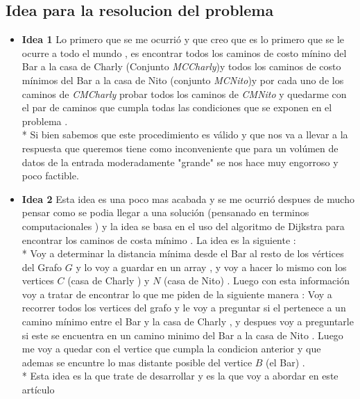 \documentclass[10pt]{article}
\begin{document}
    \subsection*{ Idea para la resolucion del problema } 
    \begin{itemize}
        \item \textbf{Idea 1 }Lo primero que se me ocurri\'o y que creo que es lo primero que se le ocurre a todo el mundo , es encontrar todos los caminos de costo m\'inino del Bar a la casa de Charly (Conjunto \textit{MCCharly})y todos los caminos de costo m\'inimos del Bar a la casa de Nito (conjunto \textit{MCNito})y por cada uno de los caminos de \textit{CMCharly} probar todos 
        los caminos de \textit{CMNito} y quedarme con el par de caminos que cumpla todas las condiciones que se exponen en el problema .
        \\*
        Si bien sabemos que este procedimiento es v\'alido y que nos va a 
        llevar a la respuesta que queremos tiene como inconveniente que 
        para un vol\'umen de datos de la entrada moderadamente "grande" 
        se nos hace muy engorroso y poco factible. 
        
        \item \textbf{Idea 2} Esta idea es una poco mas acabada y se me ocurri\'o despues de mucho pensar como se podia  llegar a una soluci\'on  (pensanado en terminos computacionales ) 
        y la idea se basa en el uso del algoritmo de Dijkstra para encontrar los caminos de costa m\'inimo . La idea es la siguiente :
        \\*
        Voy a determinar la distancia m\'inima desde el Bar al resto de los v\'ertices del Grafo $G$ y lo voy a guardar en un array , y voy a hacer lo mismo con los vertices $C$ (casa de Charly ) y $N$ (casa de Nito) . Luego con esta informaci\'on voy a tratar de encontrar lo que me piden de la siguiente manera :
        Voy a recorrer todos los vertices del grafo y le voy a preguntar si el pertenece a un camino m\'inimo entre el Bar y la casa de Charly , y despues voy a preguntarle si este se encuentra en un camino minimo del Bar a la casa de Nito .
        Luego me voy a quedar con el vertice que  cumpla la condicion anterior y que ademas se encuntre lo mas distante posible del vertice $B$ (el Bar) .    
        \\*
        Esta idea es la que trate de desarrollar y es la que voy a abordar en este art\'iculo 
    \end{itemize}
    
    
\end{document}

